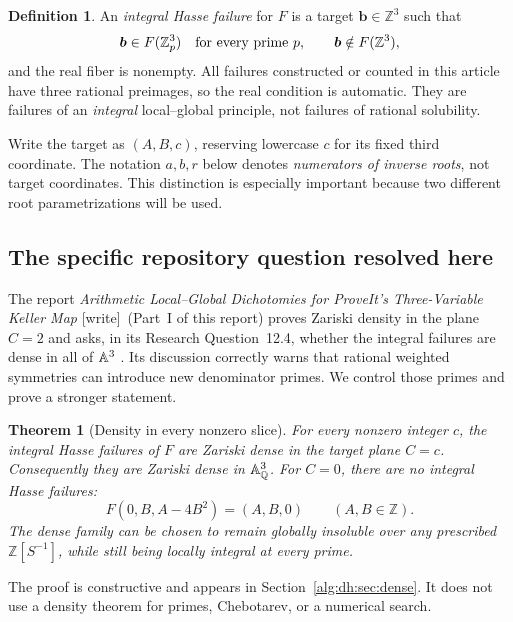 \documentclass[11pt]{article}
\numberwithin{equation}{section}
\newtheorem{theorem}{Theorem}[section]
\theoremstyle{plain}
\theoremstyle{plain}
\theoremstyle{plain}
\theoremstyle{definition}
\newtheorem{definition}[definition]{Definition}
\theoremstyle{definition}
\theoremstyle{definition}
\theoremstyle{remark}
\newcommand{\Z}{\mathbb Z}\newcommand{\Q}{\mathbb Q}
\newcommand{\target}{\boldsymbol b}
\newcommand{\wtag}{\textup{[write]}}%
\begin{document}
\begin{definition}
An \emph{integral Hasse failure} for $F$ is a target
$\target\in\Z^3$ such that
\[
 \target\in F(\Z_p^3)\quad\hbox{for every prime }p,
 \qquad \target\notin F(\Z^3),
\]
and the real fiber is nonempty. All failures constructed or counted in
this article have three rational preimages, so the real condition is
automatic. They are failures of an \emph{integral} local--global
principle, not failures of rational solubility.
\end{definition}

Write the target as $(A,B,c)$, reserving lowercase $c$ for its fixed
third coordinate. The notation $a,b,r$ below denotes \emph{numerators
of inverse roots}, not target coordinates. This distinction is especially
important because two different root parametrizations will be used.

\subsection{The specific repository question resolved here}
The report \emph{Arithmetic Local--Global Dichotomies for ProveIt's
Three-Variable Keller Map} \wtag{}~(Part~I of this report) proves Zariski density in the plane $C=2$ and
asks, in its Research Question~12.4, whether the integral failures are
dense in all of $\mathbb A^3$ \cite{dh:priorreport}. Its discussion correctly warns
that rational weighted symmetries can introduce new denominator primes.
We control those primes and prove a stronger statement.

\begin{theorem}[Density in every nonzero slice]\label{alg:dh:thm:headline-density}
For every nonzero integer $c$, the integral Hasse failures of $F$ are
Zariski dense in the target plane $C=c$. Consequently they are Zariski
dense in $\A^3_{\Q}$. For $C=0$, there are no integral Hasse failures:
\[
 F(0,B,A-4B^2)=(A,B,0)
 \qquad(A,B\in\Z).
\]
The dense family can be chosen to remain globally insoluble over any
prescribed $\Z[S^{-1}]$, while still being locally integral at every prime.
\end{theorem}
The proof is constructive and appears in Section~\ref{alg:dh:sec:dense}.
It does not use a density theorem for primes, Chebotarev, or a numerical
search.
\end{document}
